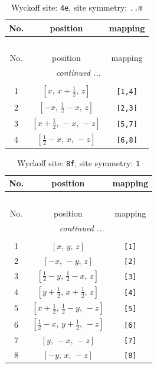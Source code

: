 \documentclass[fleqn,8pt]{jsarticle}
\begin{document}
\begin{longtable}{ccc}
\caption{Wyckoff site: {\tt 4e}, site symmetry: {\tt ..m}}
 \\
 \hline \hline
No. & position & mapping \\ \hline \endfirsthead

\multicolumn{2}{l}{\tablename\ \thetable{}} \\
 \hline \hline
No. & position & mapping \\ \hline \endhead

 \hline \hline
\multicolumn{2}{r}{\footnotesize\it continued ...} \\ \endfoot

 \hline \hline
\multicolumn{2}{r}{} \\ \endlastfoot

1 & $\left[ x,\, x + \frac{1}{2},\, z \right]$ & {\tt [1,4]} \\ \hline
2 & $\left[ - x,\, \frac{1}{2} - x,\, z \right]$ & {\tt [2,3]} \\ \hline
3 & $\left[ x + \frac{1}{2},\, - x,\, - z \right]$ & {\tt [5,7]} \\ \hline
4 & $\left[ \frac{1}{2} - x,\, x,\, - z \right]$ & {\tt [6,8]} \\
\end{longtable}
\renewcommand{\arraystretch}{1.2}
\begin{longtable}{ccc}
\caption{Wyckoff site: {\tt 8f}, site symmetry: {\tt 1}}
 \\
 \hline \hline
No. & position & mapping \\ \hline \endfirsthead

\multicolumn{2}{l}{\tablename\ \thetable{}} \\
 \hline \hline
No. & position & mapping \\ \hline \endhead

 \hline \hline
\multicolumn{2}{r}{\footnotesize\it continued ...} \\ \endfoot

 \hline \hline
\multicolumn{2}{r}{} \\ \endlastfoot

1 & $\left[ x,\, y,\, z \right]$ & {\tt [1]} \\ \hline
2 & $\left[ - x,\, - y,\, z \right]$ & {\tt [2]} \\ \hline
3 & $\left[ \frac{1}{2} - y,\, \frac{1}{2} - x,\, z \right]$ & {\tt [3]} \\ \hline
4 & $\left[ y + \frac{1}{2},\, x + \frac{1}{2},\, z \right]$ & {\tt [4]} \\ \hline
5 & $\left[ x + \frac{1}{2},\, \frac{1}{2} - y,\, - z \right]$ & {\tt [5]} \\ \hline
6 & $\left[ \frac{1}{2} - x,\, y + \frac{1}{2},\, - z \right]$ & {\tt [6]} \\ \hline
7 & $\left[ y,\, - x,\, - z \right]$ & {\tt [7]} \\ \hline
8 & $\left[ - y,\, x,\, - z \right]$ & {\tt [8]} \\
\end{longtable}
\end{document}
